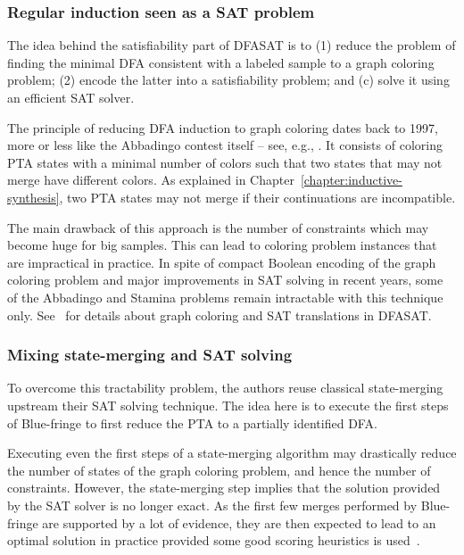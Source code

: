 \subsubsection*{Regular induction seen as a SAT problem}

The idea behind the satisfiability part of DFASAT is to (1) reduce the problem of finding the minimal DFA consistent with a labeled sample to a graph coloring problem; (2) encode the latter into a satisfiability problem; and (c) solve it using an efficient SAT solver. 

The principle of reducing DFA induction to graph coloring dates back to 1997, more or less like the Abbadingo contest itself -- see, e.g., \cite{Coste:1997}. It consists of coloring PTA states with a minimal number of colors such that two states that may not merge have different colors. As explained in Chapter~\ref{chapter:inductive-synthesis}, two PTA states may not merge if their continuations are incompatible.

The main drawback of this approach is the number of constraints which may become huge for big samples. This can lead to coloring problem instances that are impractical in practice. In spite of compact Boolean encoding of the graph coloring problem and major improvements in SAT solving in recent years, some of the Abbadingo and Stamina problems remain intractable with this technique only. See~\cite{Heule:2010} for details about graph coloring and SAT translations in DFASAT.

\subsubsection*{Mixing state-merging and SAT solving}

To overcome this tractability problem, the authors reuse classical state-merging upstream their SAT solving technique. The idea here is to execute the first steps of Blue-fringe to first reduce the PTA to a partially identified DFA. 

Executing even the first steps of a state-merging algorithm may drastically reduce the number of states of the graph coloring problem, and hence the number of constraints. However, the state-merging step implies that the solution provided by the SAT solver is no longer exact. As the first few merges performed by Blue-fringe are supported by a lot of evidence, they are then expected to lead to an optimal solution in practice provided some good scoring heuristics is used~\cite{Heule:2010}. 

